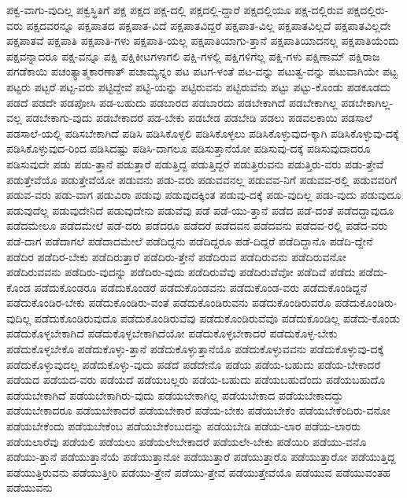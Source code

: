 {ಪಕ್ವ-ವಾಗು-ವುದಿಲ್ಲ
ಪಕ್ವಸ್ಥಿತಿಗೆ
ಪಕ್ಷ
ಪಕ್ಷದ
ಪಕ್ಷ-ದಲ್ಲಿ
ಪಕ್ಷದಲ್ಲಿ-ದ್ದಾರೆ
ಪಕ್ಷದಲ್ಲಿಯೂ
ಪಕ್ಷ-ದಲ್ಲಿರುವ
ಪಕ್ಷದಲ್ಲಿರು-ವರು
ಪಕ್ಷದವರನ್ನೂ
ಪಕ್ಷಪಾತದ
ಪಕ್ಷಪಾತ-ವಿದೆ
ಪಕ್ಷಪಾತವಿದ್ದರೆ
ಪಕ್ಷಪಾತ-ವಿಲ್ಲ
ಪಕ್ಷಪಾತವಿಲ್ಲದೆ
ಪಕ್ಷಪಾತವಿಲ್ಲದೇ
ಪಕ್ಷಪಾತವೆ
ಪಕ್ಷಪಾತಿ
ಪಕ್ಷಪಾತಿ-ಗಳು
ಪಕ್ಷಪಾತಿ-ಯಲ್ಲ
ಪಕ್ಷಪಾತಿಯಾಗು-ತ್ತಾನೆ
ಪಕ್ಷಪಾತಿಯಾದನಲ್ಲ
ಪಕ್ಷಪಾತಿಯೆಂದು
ಪಕ್ಷವನ್ನಾದರೂ
ಪಕ್ಷ-ವನ್ನೂ
ಪಕ್ಷಿ
ಪಕ್ಷಿಕೀಟಗಳಾಗಲಿ
ಪಕ್ಷಿ-ಗಳಲ್ಲಿ
ಪಕ್ಷಿಗಳಿಗೆಲ್ಲ
ಪಕ್ಷಿ-ಗಳು
ಪಕ್ಷಿಣಾಮ್
ಪಕ್ಷಿರಾಜ
ಪಗಡೆಕಾಯಿ
ಪಚಂತ್ಯಾತ್ಮಕಾರಣಾತ್
ಪಚಾಮ್ಯನ್ನಂ
ಪಟ
ಪಟಗ-ಳಂತೆ
ಪಟ-ವನ್ನು
ಪಟುತ್ವ-ವನ್ನು
ಪಟುವಾಗಿಯೇ
ಪಟ್ಟ
ಪಟ್ಟರು
ಪಟ್ಟರೆ
ಪಟ್ಟ-ವರು
ಪಟ್ಟಿದ್ದೇವೆ
ಪಟ್ಟಿ-ಯನ್ನು
ಪಟ್ಟಿರುವನು
ಪಟ್ಟಿರುವೆನು
ಪಟ್ಟು
ಪಟ್ಟು-ಕೊಂಡು
ಪಡಕೂಡದು
ಪಡದೆ
ಪಡದೇ
ಪಡಪೋಸಿ
ಪಡ-ಬಹುದು
ಪಡಬಾರದ
ಪಡಬಾರದು
ಪಡಬೇಕಾಗಿದೆ
ಪಡಬೇಕಾಗಿಲ್ಲ
ಪಡಬೇಕಾಗಿಲ್ಲ-ವಲ್ಲ
ಪಡಬೇಕಾಗು-ವುದು
ಪಡಬೇಕಾದರೆ
ಪಡ-ಬೇಕು
ಪಡಬೇಡ
ಪಡಬೇಡಿ
ಪಡಲು
ಪಡವಲಕಾಯಿ
ಪಡಸಾಲೆ
ಪಡಸಾಲೆ-ಯಲ್ಲಿ
ಪಡಿಸಬೇಕಾಗಿದೆ
ಪಡಿಸಿ
ಪಡಿಸಿಕೊಳ್ಳಲಿ
ಪಡಿಸಿಕೊಳ್ಳಲು
ಪಡಿಸಿಕೊಳ್ಳುವುದ-ಕ್ಕಾಗಿ
ಪಡಿಸಿಕೊಳ್ಳುವು-ದಕ್ಕೆ
ಪಡಿಸಿಕೊಳ್ಳುವುದ-ರಿಂದ
ಪಡಿಸಿದಷ್ಟು
ಪಡಿಸಿ-ದಾಗಲೂ
ಪಡಿಸುತ್ತಾನೆಯೋ
ಪಡಿಸುವು-ದಕ್ಕೆ
ಪಡಿಸುವುದಾದರೂ
ಪಡಿಸುವುದೇ
ಪಡು
ಪಡು-ತ್ತಾನೆ
ಪಡುತ್ತಾರೆ
ಪಡುತ್ತಿದ್ದ
ಪಡುತ್ತಿದ್ದರೆ
ಪಡುತ್ತಿರುವನು
ಪಡುತ್ತಿರು-ವರು
ಪಡು-ತ್ತೇವೆ
ಪಡುತ್ತೇವೆಯೊ
ಪಡುತ್ತೇವೆಯೋ
ಪಡುವನು
ಪಡು-ವರು
ಪಡುವವನಲ್ಲ
ಪಡುವವ-ನಿಗೆ
ಪಡುವವ-ರಲ್ಲಿ
ಪಡುವವರಿಗೆ
ಪಡುವ-ವರು
ಪಡು-ವಾಗ
ಪಡುವಿರಾ
ಪಡುವು
ಪಡುವುದಕ್ಕಿಂತ
ಪಡುವು-ದಕ್ಕೆ
ಪಡು-ವುದಿಲ್ಲ
ಪಡು-ವುದು
ಪಡುವುದೂ
ಪಡುವುದೆಲ್ಲ
ಪಡುವುದೇನಿದೆ
ಪಡುವುದೇನು
ಪಡುವೆವು
ಪಡೆ
ಪಡೆ-ಯು-ತ್ತಾನೆ
ಪಡೆದ
ಪಡೆ-ದಂತೆ
ಪಡೆದದ್ದಾವುದೂ
ಪಡೆದಮೇಲೂ
ಪಡೆದಮೇಲೆ
ಪಡೆ-ದರು
ಪಡೆದರೂ
ಪಡೆದರೆ
ಪಡೆದವನ
ಪಡೆದವನು
ಪಡೆದವ-ರಲ್ಲಿ
ಪಡೆದ-ವರು
ಪಡೆ-ದಾಗ
ಪಡೆದಾಗಲೆ
ಪಡೆದಾದಮೇಲೆ
ಪಡೆದಿದ್ದನು
ಪಡೆದಿದ್ದರೂ
ಪಡೆ-ದಿದ್ದರೆ
ಪಡೆದಿದ್ದಾನೊ
ಪಡೆದಿ-ದ್ದೇನೆ
ಪಡೆದಿರ
ಪಡೆದಿರ-ಬೇಕು
ಪಡೆದಿರುತ್ತಾರೆ
ಪಡೆದಿರು-ತ್ತೇನೆ
ಪಡೆದಿರುವ
ಪಡೆದಿರುವನು
ಪಡೆದಿರುವನೋ
ಪಡೆದಿರುವವನು
ಪಡೆದಿರು-ವುದನ್ನು
ಪಡೆದಿರು-ವುದು
ಪಡೆದಿರುವೆವು
ಪಡೆದಿರುವೆವೋ
ಪಡೆದಿವೆ
ಪಡೆದು
ಪಡೆದು-ಕೊಂಡ
ಪಡೆದುಕೊಂಡರೂ
ಪಡೆದುಕೊಂಡರೆ
ಪಡೆದುಕೊಂಡವನು
ಪಡೆದುಕೊಂಡ-ವರು
ಪಡೆದುಕೊಂಡಿದ್ದನೆ
ಪಡೆದುಕೊಂಡಿರ-ಬೇಕು
ಪಡೆದುಕೊಂಡಿರು-ವಂತೆ
ಪಡೆದುಕೊಂಡಿರುವನು
ಪಡೆದುಕೊಂಡಿರುವರೊ
ಪಡೆದುಕೊಂಡಿರು-ವುದಿಲ್ಲ
ಪಡೆದುಕೊಂಡಿರುವುದೊ
ಪಡೆದುಕೊಂಡಿರುವೆವು
ಪಡೆದುಕೊಂಡಿರುವೆವೊ
ಪಡೆದುಕೊಂಡಿಲ್ಲ
ಪಡೆದು-ಕೊಂಡು
ಪಡೆದುಕೊಳ್ಳಬೇಕಾಗಿದೆ
ಪಡೆದುಕೊಳ್ಳಬೇಕಾಗಿದೆಯೋ
ಪಡೆದುಕೊಳ್ಳಬೇಕಾದರೆ
ಪಡೆದುಕೊಳ್ಳ-ಬೇಕು
ಪಡೆದುಕೊಳ್ಳಬೇಕೊ
ಪಡೆದುಕೊಳ್ಳು-ತ್ತಾನೆ
ಪಡೆದುಕೊಳ್ಳುತ್ತಾನೆಯೊ
ಪಡೆದುಕೊಳ್ಳುವವನು
ಪಡೆದುಕೊಳ್ಳುವು-ದಕ್ಕೆ
ಪಡೆದುಕೊಳ್ಳುವುದಲ್ಲ
ಪಡೆದುಕೊಳ್ಳು-ವುದು
ಪಡೆದೆ
ಪಡೆದೇನೊ
ಪಡೆಯ
ಪಡೆಯ-ಬಹುದು
ಪಡೆಯ-ಬೇಕಾದರೆ
ಪಡೆಯದ
ಪಡೆಯದ-ವರು
ಪಡೆಯದೆ
ಪಡೆಯಬಲ್ಲರು
ಪಡೆಯ-ಬಹುದು
ಪಡೆಯಬಹುದೆಂದು
ಪಡೆಯಬಹುದೊ
ಪಡೆಯಬೇಕಾಗಿದೆ
ಪಡೆಯಬೇಕಾಗಿರು-ವುದು
ಪಡೆಯಬೇಕಾಗಿಲ್ಲ
ಪಡೆಯಬೇಕಾದ
ಪಡೆಯಬೇಕಾದದ್ದು
ಪಡೆಯಬೇಕಾದರೂ
ಪಡೆಯಬೇಕಾದರೆ
ಪಡೆಯಬೇಕಾರೆ
ಪಡೆಯ-ಬೇಕು
ಪಡೆಯಬೇಕೆಂ
ಪಡೆಯಬೇಕೆಂದಿರು-ವನೋ
ಪಡೆಯಬೇಕೆಂದು
ಪಡೆಯಬೇಕೆಂಬ
ಪಡೆಯಬೇಕೆಂಬುದನ್ನು
ಪಡೆಯಬೇಡಿ
ಪಡೆಯ-ಲಾರ
ಪಡೆಯ-ಲಾರರು
ಪಡೆಯಲಾರೆವು
ಪಡೆಯಲಿ
ಪಡೆಯಲು
ಪಡೆಯಲೇಬೇಕಾದರೆ
ಪಡೆಯಲೇ-ಬೇಕು
ಪಡೆಯಿರಿ
ಪಡೆಯು-ವನೊ
ಪಡೆಯು-ತ್ತಾನೆ
ಪಡೆಯುತ್ತಾನೆಯೆ
ಪಡೆಯುತ್ತಾನೋ
ಪಡೆಯುತ್ತಾರೆ
ಪಡೆಯುತ್ತಾರೊ
ಪಡೆಯುತ್ತಾರೋ
ಪಡೆಯುತ್ತಿದ್ದ
ಪಡೆಯುತ್ತಿರುವನು
ಪಡೆಯುತ್ತೀರಿ
ಪಡೆಯು-ತ್ತೇನೆ
ಪಡೆಯು-ತ್ತೇವೆ
ಪಡೆಯುತ್ತೇವೆಯೊ
ಪಡೆಯುವ
ಪಡೆಯುವಂತಹ
ಪಡೆಯುವನು
}

